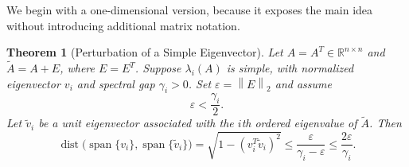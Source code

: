 \documentclass[14pt,letterpaper]{article}
\theoremstyle{plain}
\newtheorem{theorem}{Theorem}[section]
\theoremstyle{definition}
\theoremstyle{remark}
\newcommand{\R}{\mathbb{R}}
\newcommand{\norm}[1]{\left\lVert #1 \right\rVert}
\DeclareMathOperator{\Span}{span}
\DeclareMathOperator{\dist}{dist}
\begin{document}
We begin with a one-dimensional version, because it
exposes the main idea without introducing additional
matrix notation.

\begin{theorem}[Perturbation of a Simple Eigenvector]
\label{thm:dk_simple}
Let $A=A^T\in\R^{n\times n}$ and
$\widetilde A=A+E$, where $E=E^T$.
Suppose $\lambda_i(A)$ is simple, with normalized
eigenvector $v_i$ and spectral gap $\gamma_i>0$.
Set $\varepsilon=\norm{E}_2$ and assume
\[
\varepsilon<\frac{\gamma_i}{2}.
\]
Let $\widetilde v_i$ be a unit eigenvector associated
with the $i$th ordered eigenvalue of $\widetilde A$.
Then
\[
\boxed{
\dist\bigl(\Span\{v_i\},\Span\{\widetilde v_i\}\bigr)
=\sqrt{1-(v_i^T\widetilde v_i)^2}
\leq\frac{\varepsilon}{\gamma_i-\varepsilon}
\leq\frac{2\varepsilon}{\gamma_i}.
}
\]
\end{theorem}
\end{document}
